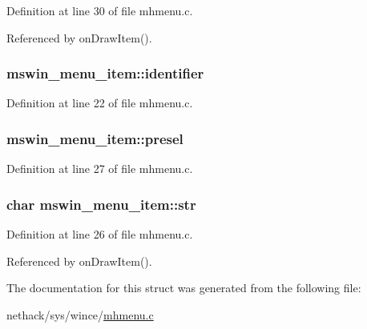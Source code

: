 Definition at line 30 of file mhmenu.\+c.



Referenced by on\+Draw\+Item().

\hypertarget{structmswin__menu__item_a0f461c71562a0e636598ff3a1c53556b}{
\subsubsection[{identifier}]{ mswin\+\_\+menu\+\_\+item\+::identifier}}\label{structmswin__menu__item_a0f461c71562a0e636598ff3a1c53556b}


Definition at line 22 of file mhmenu.\+c.

\hypertarget{structmswin__menu__item_a6662294ee03513b5f0997810605aec39}{
\subsubsection[{presel}]{ mswin\+\_\+menu\+\_\+item\+::presel}}\label{structmswin__menu__item_a6662294ee03513b5f0997810605aec39}


Definition at line 27 of file mhmenu.\+c.

\hypertarget{structmswin__menu__item_a6644e3aa5c3da84efdad362cc01adc66}{
\subsubsection[{str}]{\setlength{\rightskip}{0pt plus 5cm}char mswin\+\_\+menu\+\_\+item\+::str}}\label{structmswin__menu__item_a6644e3aa5c3da84efdad362cc01adc66}


Definition at line 26 of file mhmenu.\+c.



Referenced by on\+Draw\+Item().



The documentation for this struct was generated from the following file\+:\begin{DoxyCompactItemize}
\item 
nethack/sys/wince/\hyperlink{sys_2wince_2mhmenu_8c}{mhmenu.\+c}\end{DoxyCompactItemize}
